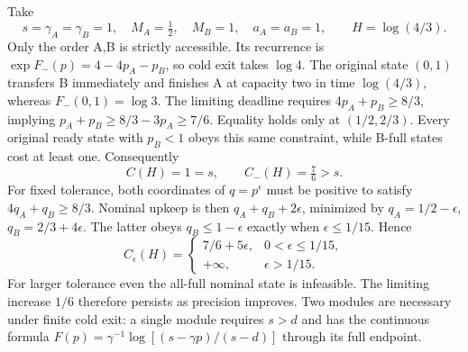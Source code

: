 \begin{example}
\label{ex:precision-jump}
Take
\[
 s=\gamma_A=\gamma_B=1,\quad
 M_A=\tfrac12,\quad M_B=1,\quad a_A=a_B=1,
 \qquad H=\log(4/3).
\]
Only the order A,B is strictly accessible. Its recurrence is
$\exp F_-(p)=4-4p_A-p_B$, so cold exit takes $\log4$.
The original state $(0,1)$ transfers B immediately and finishes A at
capacity two in time $\log(4/3)$, whereas $F_-(0,1)=\log3$.
The limiting deadline requires $4p_A+p_B\geq8/3$, implying
$p_A+p_B\geq8/3-3p_A\geq7/6$. Equality holds only at
$(1/2,2/3)$. Every original ready state with $p_B<1$ obeys this same
constraint, while B-full states cost at least one. Consequently
\[
 C(H)=1=s,\qquad C_-(H)=\tfrac76>s.
\]
For fixed tolerance, both coordinates of $q=p^\epsilon$ must be positive
to satisfy $4q_A+q_B\geq8/3$. Nominal upkeep is then
$q_A+q_B+2\epsilon$, minimized by
$q_A=1/2-\epsilon$, $q_B=2/3+4\epsilon$. The latter obeys
$q_B\leq1-\epsilon$ exactly when $\epsilon\leq1/15$. Hence
\[
 C_\epsilon(H)=
 \begin{cases}
  7/6+5\epsilon,&0<\epsilon\leq1/15,\\
  +\infty,&\epsilon>1/15.
 \end{cases}
\]
For larger tolerance even the all-full nominal state is infeasible.
The limiting increase $1/6$ therefore persists as precision improves.
Two modules are necessary under finite cold exit: a single module requires
$s>d$ and has the continuous formula
$F(p)=\gamma^{-1}\log[(s-\gamma p)/(s-d)]$ through its full endpoint.
\end{example}
